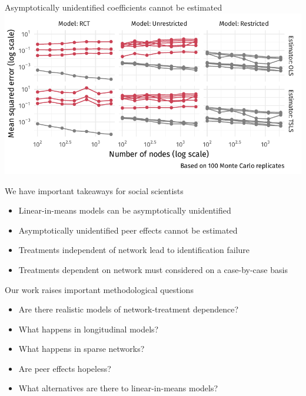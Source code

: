 \documentclass[aspectratio=169]{beamer}
\theoremstyle{remark}
\begin{document}
\begin{frame}{\textcolor{BrickRed}{Asymptotically unidentified} coefficients cannot be estimated}
    \centering
    \includegraphics{./figures/simulations/defense-mse-all.pdf}
\end{frame}

\begin{frame}{We have important takeaways for social scientists}
    \begin{itemize}
        \item Linear-in-means models can be asymptotically unidentified
        \item Asymptotically unidentified peer effects cannot be estimated
        \item Treatments independent of network lead to identification failure
        \item Treatments dependent on network must considered on a case-by-case basis
    \end{itemize}
\end{frame}

\begin{frame}{Our work raises important methodological questions}
    \begin{itemize}
        \item Are there realistic models of network-treatment dependence?
        \item What happens in longitudinal models?
        \item What happens in sparse networks?
        \item Are peer effects hopeless?
        \item What alternatives are there to linear-in-means models?
    \end{itemize}
\end{frame}
\end{document}
